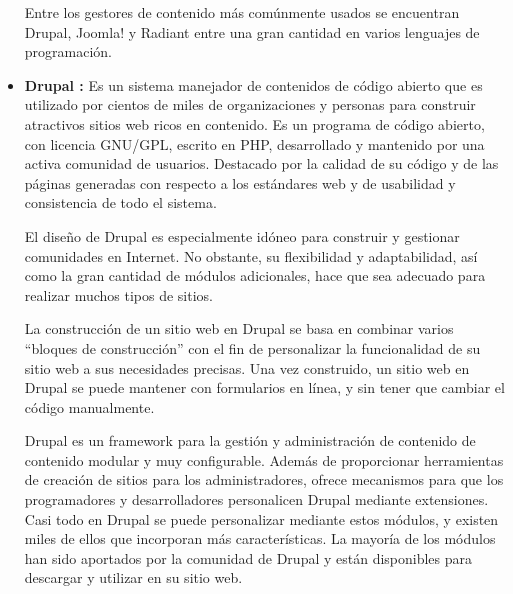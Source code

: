 \documentclass[letterpaper, 11pt, oneside]{article}
\theoremstyle{definition}
\theoremstyle{remark}
\begin{document}
\begin{itemize}
Entre los gestores de contenido más comúnmente usados se encuentran Drupal, Joomla! y Radiant entre una gran cantidad en varios lenguajes de programación.

\item \textbf{Drupal :} \cite{Drupal} \cite{Drupal2} Es un sistema manejador de contenidos de código abierto que es utilizado por cientos de miles de organizaciones y personas para construir atractivos sitios web ricos en contenido. Es un programa de código abierto, con licencia GNU/GPL, escrito en PHP, desarrollado y mantenido por una activa comunidad de usuarios. Destacado por la calidad de su código y de las páginas generadas con respecto a los estándares web y de usabilidad y consistencia de todo el sistema.

El diseño de Drupal es especialmente idóneo para construir y gestionar comunidades en Internet. No obstante, su flexibilidad y adaptabilidad, así como la gran cantidad de módulos adicionales, hace que sea adecuado para realizar muchos tipos de sitios.

La construcción de un sitio web en Drupal se basa en combinar varios ``bloques de construcción'' con el fin de personalizar la funcionalidad de su sitio web a sus necesidades precisas. Una vez construido, un sitio web en Drupal se puede mantener con formularios en línea, y sin tener que cambiar el código manualmente. 

Drupal es un framework para la gestión y administración de contenido de contenido modular y muy configurable. Además de proporcionar herramientas de creación de sitios para los administradores, ofrece mecanismos para que los programadores y desarrolladores personalicen Drupal mediante extensiones. Casi todo en Drupal se puede personalizar mediante estos módulos, y existen miles de ellos que incorporan más características. La mayoría de los módulos han sido aportados por la comunidad de Drupal y están disponibles para descargar y utilizar en su sitio web.


\end{itemize}
\end{document}
